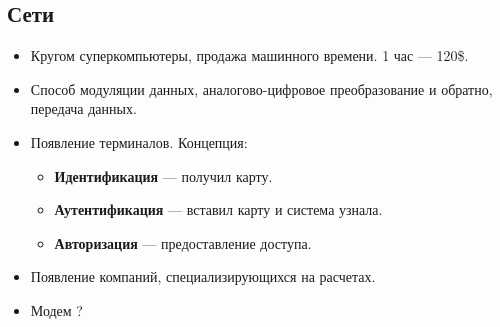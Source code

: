 \documentclass[12pt, a4paper]{report}
\begin{document}
\subsection{Сети}
\begin{itemize}
    \item Кругом суперкомпьютеры, продажа машинного времени. 1 час --- 120\$.

    \item Способ модуляции данных, аналогово-цифровое преобразование и обратно, передача данных.

    \item Появление терминалов. Концепция: 
        \begin{itemize}
            \item \textbf{Идентификация} --- получил карту.
            \item \textbf{Аутентификация} --- вставил карту и система узнала.
            \item \textbf{Авторизация} --- предоставление доступа.
        \end{itemize}

    \item Появление компаний, специализирующихся на расчетах.

    \item Модем ?
\end{itemize}
\end{document}
